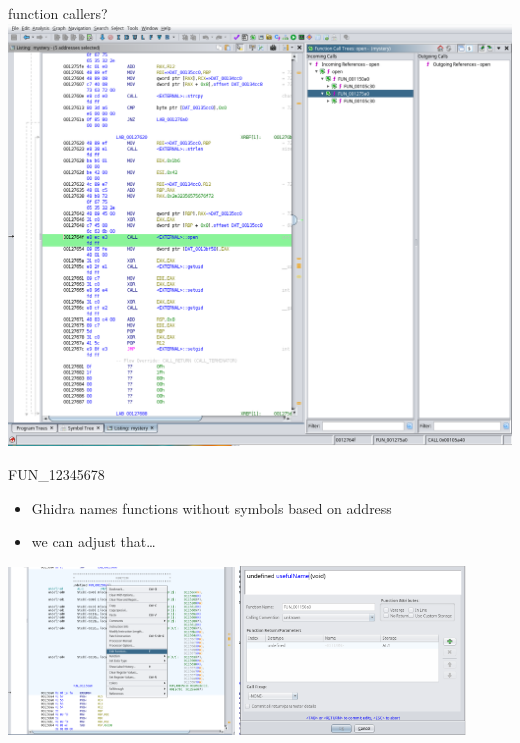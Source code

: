 \begin{frame}{function callers?}
\includegraphics[width=\textwidth]{ghidra-symb-refs-ex}
\end{frame}

\begin{frame}{FUN\_12345678}
    \begin{itemize}
    \item Ghidra names functions without symbols based on address
    \item we can adjust that\ldots
    \end{itemize}
\includegraphics[width=0.45\textwidth]{ghidra-edit-func-cut}
\includegraphics[width=0.45\textwidth]{ghidra-edit-func-dialog}
\end{frame}

